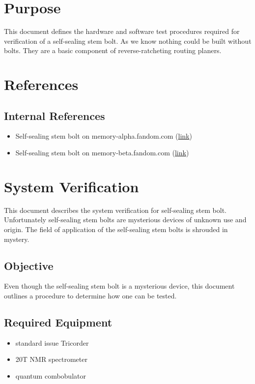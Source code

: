 \documentclass[a4paper,12pt]{article}
\begin{document}
\section{Purpose}
This document defines the hardware and software test procedures required for verification of a
self-sealing stem bolt. As we know nothing could be built without bolts. They are a basic component of reverse-ratcheting routing planers.
\section{References}

\subsection{Internal References}

\begin{itemize}
	\item  Self-sealing stem bolt on memory-alpha.fandom.com (\href{https://memory-alpha.fandom.com/wiki/Self-sealing_stem_bolt}{link})
	\item  Self-sealing stem bolt on memory-beta.fandom.com (\href{https://memory-beta.fandom.com/wiki/Self-sealing_stembolt}{link})
\end{itemize}

\section{System Verification}
This document describes the system verification for self-sealing stem bolt. Unfortunately self-sealing stem bolts are mysterious devices of unknown use and origin. The field of application of the self-sealing stem bolts is shrouded in mystery.

\subsection{Objective}

Even though the self-sealing stem bolt is a mysterious device, this document outlines a procedure to determine how one can be tested.

\subsection{Required Equipment}

\begin{itemize}
	\item standard issue Tricorder
	\item 20T NMR spectrometer
	\item quantum combobulator
\end{itemize}
\end{document}
